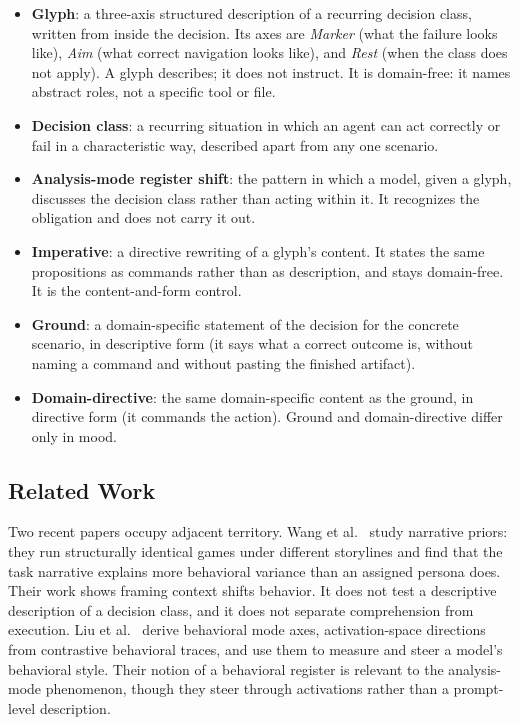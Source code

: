 \documentclass[11pt,a4paper]{article}
\begin{document}
\begin{itemize}
  \item \textbf{Glyph}: a three-axis structured description of a recurring decision
    class, written from inside the decision. Its axes are \emph{Marker} (what the
    failure looks like), \emph{Aim} (what correct navigation looks like), and
    \emph{Rest} (when the class does not apply). A glyph describes; it does not
    instruct. It is domain-free: it names abstract roles, not a specific tool or
    file.
  \item \textbf{Decision class}: a recurring situation in which an agent can act
    correctly or fail in a characteristic way, described apart from any one scenario.
  \item \textbf{Analysis-mode register shift}: the pattern in which a model, given a
    glyph, discusses the decision class rather than acting within it. It recognizes
    the obligation and does not carry it out.
  \item \textbf{Imperative}: a directive rewriting of a glyph's content. It states
    the same propositions as commands rather than as description, and stays
    domain-free. It is the content-and-form control.
  \item \textbf{Ground}: a domain-specific statement of the decision for the concrete
    scenario, in descriptive form (it says what a correct outcome is, without naming
    a command and without pasting the finished artifact).
  \item \textbf{Domain-directive}: the same domain-specific content as the ground, in
    directive form (it commands the action). Ground and domain-directive differ only
    in mood.
\end{itemize}

\subsection{Related Work}

Two recent papers occupy adjacent territory. Wang et al.~\citep{wang2026narrative}
study narrative priors: they run structurally identical games under different
storylines and find that the task narrative explains more behavioral variance than
an assigned persona does. Their work shows framing context shifts behavior. It does
not test a descriptive description of a decision class, and it does not separate
comprehension from execution. Liu et al.~\citep{liu2026behavioral} derive behavioral
mode axes, activation-space directions from contrastive behavioral traces, and use
them to measure and steer a model's behavioral style. Their notion of a behavioral
register is relevant to the analysis-mode phenomenon, though they steer through
activations rather than a prompt-level description.
\end{document}
